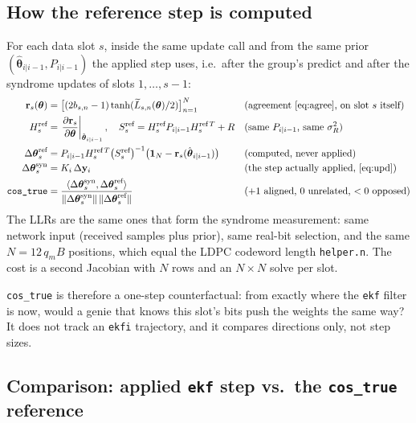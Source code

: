 \documentclass{article}
\newcommand{\state}{\boldsymbol{\theta}}
\begin{document}
\subsection{How the reference step is computed}

For each data slot $s$, inside the same update call and from the same prior
$(\hat{\state}_{i|i-1}, P_{i|i-1})$ the applied step uses, i.e.\ after the group's predict and
after the syndrome updates of slots $1,\dots,s-1$:
\begin{align}
\mathbf{r}_s(\state) &= \big[(2b_{s,n}-1)\tanh(\widetilde{L}_{s,n}(\state)/2)\big]_{n=1}^{N}
  && \text{(agreement \eqref{eq:agree}, on slot $s$ itself)} \\
H^{\text{ref}}_s &= \left.\frac{\partial \mathbf{r}_s}{\partial\state}\right|_{\hat{\state}_{i|i-1}},
\quad S^{\text{ref}}_s = H^{\text{ref}}_s P_{i|i-1} H^{\text{ref}\,T}_s + R
  && \text{(same $P_{i|i-1}$, same $\sigma_R^2$)} \\
\Delta\state^{\text{ref}}_s &= P_{i|i-1}H^{\text{ref}\,T}_s \big(S^{\text{ref}}_s\big)^{-1}
  \big(\mathbf{1}_N-\mathbf{r}_s(\hat{\state}_{i|i-1})\big)
  && \text{(computed, never applied)} \\
\Delta\state^{\text{syn}}_s &= K_i\,\Delta\mathbf{y}_i
  && \text{(the step actually applied, \eqref{eq:upd})} \\
\texttt{cos\_true} &= \frac{\langle \Delta\state^{\text{syn}}_s, \Delta\state^{\text{ref}}_s\rangle}
  {\|\Delta\state^{\text{syn}}_s\|\,\|\Delta\state^{\text{ref}}_s\|}
  && \text{($+1$ aligned, $0$ unrelated, $<0$ opposed)}
\end{align}
The LLRs are the same ones that form the syndrome measurement: same network input (received
samples plus prior), same real-bit selection, and the same $N=12\,q_m B$ positions, which equal
the LDPC codeword length \texttt{helper.n}. The cost is a second Jacobian with $N$ rows and an
$N\times N$ solve per slot.

\texttt{cos\_true} is therefore a one-step counterfactual: from exactly where the \texttt{ekf}
filter is now, would a genie that knows this slot's bits push the weights the same way? It does
not track an \texttt{ekfi} trajectory, and it compares directions only, not step sizes.

\subsection{Comparison: applied \texttt{ekf} step vs.\ the \texttt{cos\_true} reference}
\end{document}
